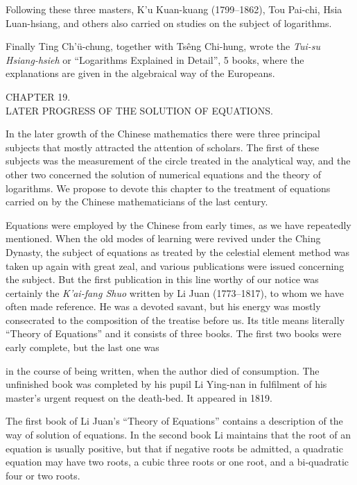 \documentclass[11pt]{article}
\newcommand{\scanpage}[2]{\clearpage\setcounter{footnote}{0}\noindent{\footnotesize\color{gray}PDF page #1 · #2}\par\medskip}
\newcommand{\scanfooter}{}
\begin{document}
Following these three masters, K'u Kuan-kuang (1799--1862), Tou Pai-chi, Hsia Luan-hsiang, and others also carried on studies on the subject of logarithms.

Finally Ting Ch'ü-chung, together with Tsêng Chi-hung, wrote the \emph{Tui-su Hsiang-hsieh} or ``Logarithms Explained in Detail'', 5 books, where the explanations are given in the algebraical way of the Europeans.

\begin{center}
CHAPTER 19.\\
LATER PROGRESS OF THE SOLUTION OF EQUATIONS.
\end{center}

In the later growth of the Chinese mathematics there were three principal subjects that mostly attracted the attention of scholars. The first of these subjects was the measurement of the circle treated in the analytical way, and the other two concerned the solution of numerical equations and the theory of logarithms. We propose to devote this chapter to the treatment of equations carried on by the Chinese mathematicians of the last century.

Equations were employed by the Chinese from early times, as we have repeatedly mentioned. When the old modes of learning were revived under the Ching Dynasty, the subject of equations as treated by the celestial element method was taken up again with great zeal, and various publications were issued concerning the subject. But the first publication in this line worthy of our notice was certainly the \emph{K'ai-fang Shuo} written by Li Juan (1773--1817), to whom we have often made reference. He was a devoted savant, but his energy was mostly consecrated to the composition of the treatise before us. Its title means literally ``Theory of Equations'' and it consists of three books. The first two books were early complete, but the last one was
\scanfooter

\scanpage{0143}{Chapter 19, printed page 129}
in the course of being written, when the author died of consumption. The unfinished book was completed by his pupil Li Ying-nan in fulfilment of his master's urgent request on the death-bed. It appeared in 1819.

The first book of Li Juan's ``Theory of Equations'' contains a description of the way of solution of equations. In the second book Li maintains that the root of an equation is usually positive, but that if negative roots be admitted, a quadratic equation may have two roots, a cubic three roots or one root, and a bi-quadratic four or two roots.
\end{document}
